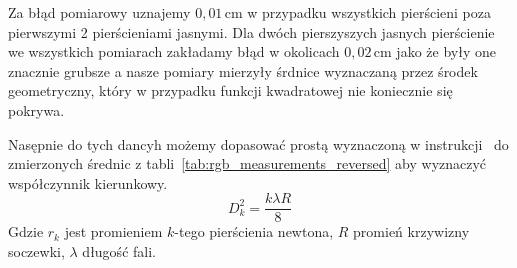 \documentclass[12pt]{article}
\begin{document}
Za błąd pomiarowy uznajemy \(0{,}01 \, \mathrm{cm}\) w przypadku wszystkich pierścieni poza pierwszymi 2 pierścieniami jasnymi.
Dla dwóch pierszyszych jasnych pierścienie we wszystkich pomiarach zakładamy błąd w okolicach \(0{,}02 \, \mathrm{cm}\) jako że były one znacznie grubsze a nasze pomiary mierzyły śrdnice wyznaczaną przez środek geometryczny, który w przypadku funkcji kwadratowej nie koniecznie się pokrywa.

Nasępnie do tych dancyh możemy dopasować prostą wyznaczoną w instrukcji~\cite{skrypt} do zmierzonych średnic z tabli~\ref{tab:rgb_measurements_reversed} aby wyznaczyć współczynnik kierunkowy.
\begin{equation}
	D_k^2 = \frac{k \lambda R}{8}
	\label{eq:radious}
\end{equation}
Gdzie \(r_k\) jest promieniem \(k\)-tego pierścienia newtona, \(R\) promień krzywizny soczewki, \(\lambda\) długość fali.
\end{document}
